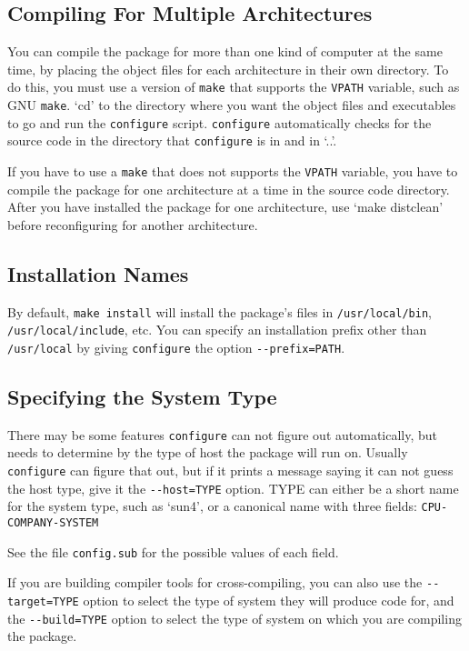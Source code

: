 \begin{appendix}
\subsection*{Compiling For Multiple Architectures}

   You can compile the package for more than one kind of computer at the
same time, by placing the object files for each architecture in their
own directory.  To do this, you must use a version of \verb+make+ that
supports the \verb+VPATH+ variable, such as GNU \verb+make+.  `cd' to the
directory where you want the object files and executables to go and run
the \verb+configure+ script.  \verb+configure+ automatically checks for the
source code in the directory that \verb+configure+ is in and in `..'.

   If you have to use a \verb+make+ that does not supports the \verb+VPATH+
variable, you have to compile the package for one architecture at a time
in the source code directory.  After you have installed the package for
one architecture, use `make distclean' before reconfiguring for another
architecture.

\subsection*{Installation Names}

By default, \verb+make install+ will install the package's files in
\verb+/usr/local/bin+, \verb+/usr/local/include+, etc.  You can specify an
installation prefix other than \verb+/usr/local+ by giving \verb+configure+ the
option \verb+--prefix=PATH+.



\subsection*{Specifying the System Type}


   There may be some features \verb+configure+ can not figure out
automatically, but needs to determine by the type of host the package
will run on.  Usually \verb+configure+ can figure that out, but if it prints
a message saying it can not guess the host type, give it the
\verb+--host=TYPE+ option.  TYPE can either be a short name for the system
type, such as `sun4', or a canonical name with three fields: 
\verb+CPU-COMPANY-SYSTEM+

See the file \verb+config.sub+ for the possible values of each field. 
 
   If you are building compiler tools for cross-compiling, you can also
use the \verb+--target=TYPE+ option to select the type of system they will
produce code for, and the \verb+--build=TYPE+ option to select the type of
system on which you are compiling the package.


\end{appendix}
